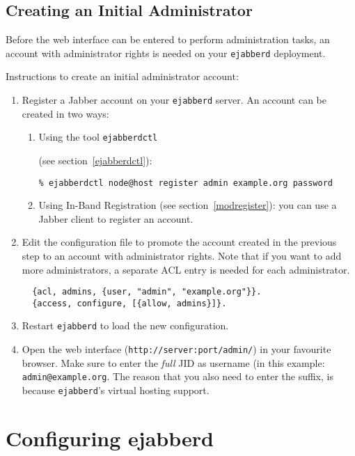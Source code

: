 \documentclass[a4paper,10pt]{book}
\newcommand{\ind}[1]{\begin{latexonly}\index{#1}\end{latexonly}}
\newcommand{\jid}[1]{\texttt{#1}}
\newcommand{\term}[1]{\texttt{#1}}
\newcommand{\ejabberd}{\texttt{ejabberd}}
\newcommand{\Jabber}{Jabber}
\begin{document}


\section{Creating an Initial Administrator}
\label{initialadmin}

Before the web interface can be entered to perform administration tasks, an
account with administrator rights is needed on your \ejabberd{} deployment.

Instructions to create an initial administrator account:
\begin{enumerate}
\item Register a Jabber account on your \ejabberd{} server. An account can be
  created in two ways:
  \begin{enumerate}
  \item Using the tool \term{ejabberdctl}\ind{ejabberdctl} (see
    section~\ref{ejabberdctl}):
    \begin{verbatim}
% ejabberdctl node@host register admin example.org password
\end{verbatim} 
  \item Using In-Band Registration (see section~\ref{modregister}): you can
    use a \Jabber{} client to register an account.
  \end{enumerate}
\item Edit the configuration file to promote the account created in the previous
  step to an account with administrator rights. Note that if you want to add
  more administrators, a separate ACL entry is needed for each administrator.
  \begin{verbatim}
  {acl, admins, {user, "admin", "example.org"}}.
  {access, configure, [{allow, admins}]}.
\end{verbatim} 
\item Restart \ejabberd{} to load the new configuration.
\item Open the web interface (\verb|http://server:port/admin/|) in your
  favourite browser. Make sure to enter the \emph{full} JID as username (in this
  example: \jid{admin@example.org}. The reason that you also need to enter the
  suffix, is because \ejabberd{}'s virtual hosting support.
\end{enumerate}


\chapter{Configuring ejabberd}
\end{document}
